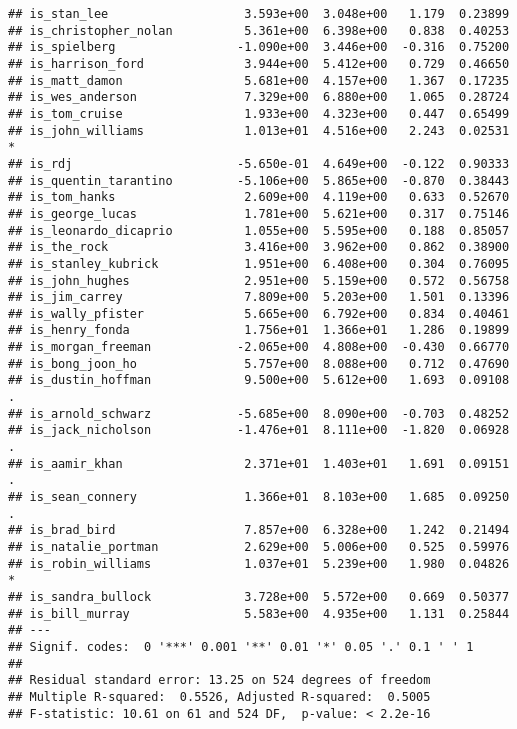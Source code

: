 \documentclass[
]{article}
\begin{document}
\begin{verbatim}
## is_stan_lee                   3.593e+00  3.048e+00   1.179  0.23899   
## is_christopher_nolan          5.361e+00  6.398e+00   0.838  0.40253   
## is_spielberg                 -1.090e+00  3.446e+00  -0.316  0.75200   
## is_harrison_ford              3.944e+00  5.412e+00   0.729  0.46650   
## is_matt_damon                 5.681e+00  4.157e+00   1.367  0.17235   
## is_wes_anderson               7.329e+00  6.880e+00   1.065  0.28724   
## is_tom_cruise                 1.933e+00  4.323e+00   0.447  0.65499   
## is_john_williams              1.013e+01  4.516e+00   2.243  0.02531 * 
## is_rdj                       -5.650e-01  4.649e+00  -0.122  0.90333   
## is_quentin_tarantino         -5.106e+00  5.865e+00  -0.870  0.38443   
## is_tom_hanks                  2.609e+00  4.119e+00   0.633  0.52670   
## is_george_lucas               1.781e+00  5.621e+00   0.317  0.75146   
## is_leonardo_dicaprio          1.055e+00  5.595e+00   0.188  0.85057   
## is_the_rock                   3.416e+00  3.962e+00   0.862  0.38900   
## is_stanley_kubrick            1.951e+00  6.408e+00   0.304  0.76095   
## is_john_hughes                2.951e+00  5.159e+00   0.572  0.56758   
## is_jim_carrey                 7.809e+00  5.203e+00   1.501  0.13396   
## is_wally_pfister              5.665e+00  6.792e+00   0.834  0.40461   
## is_henry_fonda                1.756e+01  1.366e+01   1.286  0.19899   
## is_morgan_freeman            -2.065e+00  4.808e+00  -0.430  0.66770   
## is_bong_joon_ho               5.757e+00  8.088e+00   0.712  0.47690   
## is_dustin_hoffman             9.500e+00  5.612e+00   1.693  0.09108 . 
## is_arnold_schwarz            -5.685e+00  8.090e+00  -0.703  0.48252   
## is_jack_nicholson            -1.476e+01  8.111e+00  -1.820  0.06928 . 
## is_aamir_khan                 2.371e+01  1.403e+01   1.691  0.09151 . 
## is_sean_connery               1.366e+01  8.103e+00   1.685  0.09250 . 
## is_brad_bird                  7.857e+00  6.328e+00   1.242  0.21494   
## is_natalie_portman            2.629e+00  5.006e+00   0.525  0.59976   
## is_robin_williams             1.037e+01  5.239e+00   1.980  0.04826 * 
## is_sandra_bullock             3.728e+00  5.572e+00   0.669  0.50377   
## is_bill_murray                5.583e+00  4.935e+00   1.131  0.25844   
## ---
## Signif. codes:  0 '***' 0.001 '**' 0.01 '*' 0.05 '.' 0.1 ' ' 1
## 
## Residual standard error: 13.25 on 524 degrees of freedom
## Multiple R-squared:  0.5526, Adjusted R-squared:  0.5005 
## F-statistic: 10.61 on 61 and 524 DF,  p-value: < 2.2e-16
\end{verbatim}
\end{document}
